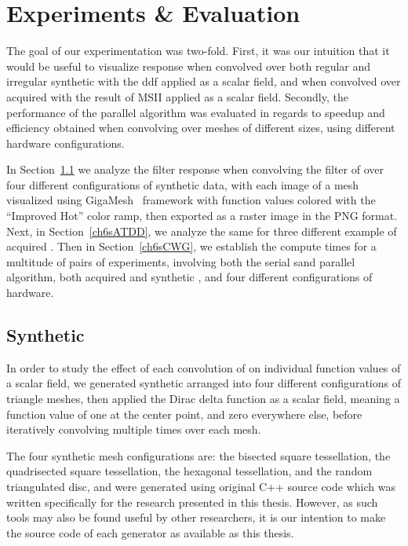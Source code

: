 \chapter{Experiments \& Evaluation}
\label{ch6}
The goal of our experimentation was two-fold. First, it was our intuition that it would be useful to visualize  response when convolved over both regular and irregular synthetic \tdd{} with the \gls{ddf} applied as a scalar field, and when convolved over acquired \tdd{} with the result of \gls{MSII} applied as a scalar field. Secondly, the performance of the parallel algorithm was evaluated in regards to speedup and efficiency obtained when convolving  over meshes of different sizes, using different hardware configurations.

In Section~\ref{ch6sSTDD} we analyze the filter response when convolving the filter of over four different configurations of synthetic data, with each image of a mesh visualized using GigaMesh~\cite{Mara10} framework with function values colored with the ``Improved Hot'' color ramp, then exported as a raster image in the \gls{PNG} format. Next, in Section~\ref{ch6sATDD}, we analyze the same for three different example of acquired \tdd{}. Then in Section~\ref{ch6sCWG}, we establish the compute times for a multitude of pairs of experiments, involving both the serial sand parallel algorithm, both acquired and synthetic \tdd{}, and four different configurations of hardware.

%
%
%
%
%
%
\section{Synthetic \tdd{}}
\label{ch6sSTDD}
In order to study the effect of each convolution of  on individual function values of a scalar field, we generated synthetic \tdd{} arranged into four different configurations of triangle meshes, then applied the Dirac delta function as a scalar field, meaning a function value of one at the center point, and zero everywhere else, before iteratively convolving  multiple times over each mesh.

The four synthetic mesh configurations are: the bisected square tessellation, the quadrisected square tessellation, the hexagonal tessellation, and the random triangulated disc, and were generated using original C++ source code which was written specifically for the research presented in this thesis. However, as such tools may also be found useful by other researchers, it is our intention to make the source code of each generator as available as this thesis.

